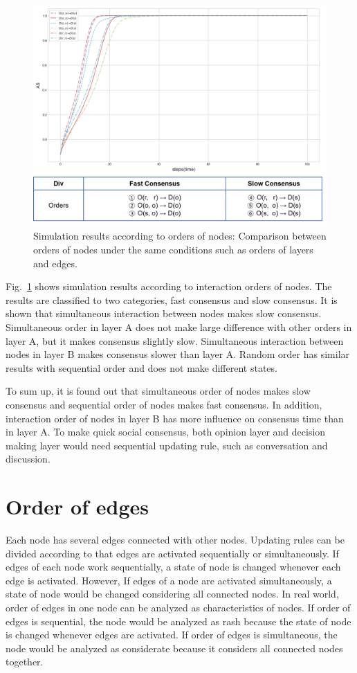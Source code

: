 \begin{figure}[!htb]
	\centering
	\includegraphics[width=\hsize]{figure/chap4_nodeorder.png}
	\caption{Simulation results according to orders of nodes: Comparison between orders of nodes under the same conditions such as orders of layers and edges.}
	\label{chap4_nodeorder}
\end{figure}

Fig.~\ref{chap4_nodeorder} shows simulation results according to interaction orders of nodes. The results are classified to two categories, fast consensus and slow consensus. It is shown that simultaneous interaction between nodes makes slow consensus. Simultaneous order in layer A does not make large difference with other orders in layer A, but it makes consensus slightly slow. Simultaneous interaction between nodes in layer B makes consensus slower than layer A. Random order has similar results with sequential order and does not make different states. 

To sum up, it is found out that simultaneous order of nodes makes slow consensus and sequential order of nodes makes fast consensus. In addition, interaction order of nodes in layer B has more influence on consensus time than in layer A. To make quick social consensus, both opinion layer and decision making layer would need sequential updating rule, such as conversation and discussion.\\     

\section{Order of edges}
Each node has several edges connected with other nodes. Updating rules can be divided according to that edges are activated sequentially or simultaneously. If edges of each node work sequentially, a state of node is changed whenever each edge is activated. However, If edges of a node are activated simultaneously, a state of node would be changed considering all connected nodes. In real world, order of edges in one node can be analyzed as characteristics of nodes. If order of edges is sequential, the node would be analyzed as rash because the state of node is changed whenever edges are activated. If order of edges is simultaneous, the node would be analyzed as considerate because it considers all connected nodes together. 


